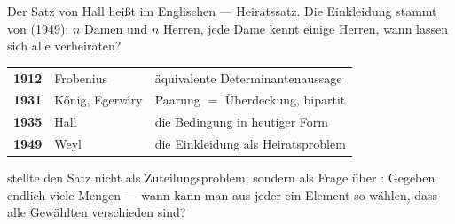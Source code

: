 \begin{geschichte}
Der Satz von Hall heißt im Englischen  --- Heiratssatz. Die Einkleidung stammt von  (1949): $n$ Damen und $n$ Herren, jede Dame kennt einige Herren, wann lassen sich alle verheiraten?

\begin{center}
{\small
\renewcommand{\arraystretch}{1.42}
\begin{tabular}{@{}P{1.4cm}P{2.4cm}P{4.0cm}@{}}
\toprule
\textbf{1912} & Frobenius & äquivalente Determinantenaussage\\
\textbf{1931} & Kőnig, Egerváry & Paarung $=$ Überdeckung, bipartit\\
\textbf{1935} & Hall & die Bedingung in heutiger Form\\
\textbf{1949} & Weyl & die Einkleidung als Heiratsproblem\\
\bottomrule
\end{tabular}}
\end{center}

 stellte den Satz nicht als Zuteilungsproblem, sondern als Frage über : Gegeben endlich viele Mengen --- wann kann man aus jeder ein Element so wählen, dass alle Gewählten verschieden sind?

\begin{center}
\begin{minipage}{0.9\textwidth}
\end{minipage}
\end{center}
\end{geschichte}

